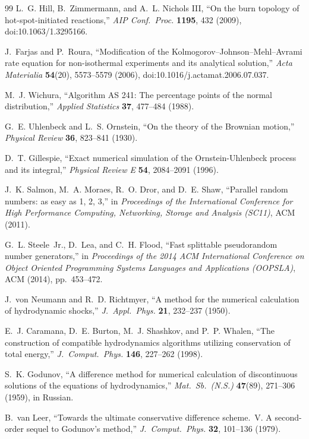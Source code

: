 \begin{thebibliography}{99}
L.~G. Hill, B.~Zimmermann, and A.~L. Nichols III, ``On the burn topology
of hot-spot-initiated reactions,'' \emph{AIP Conf.\ Proc.} \textbf{1195},
432 (2009), doi:10.1063/1.3295166.

J.~Farjas and P.~Roura, ``Modification of the
Kolmogorov--Johnson--Mehl--Avrami rate equation for non-isothermal
experiments and its analytical solution,'' \emph{Acta Materialia}
\textbf{54}(20), 5573--5579 (2006), doi:10.1016/j.actamat.2006.07.037.

M.~J. Wichura, ``Algorithm AS 241: The percentage points of the normal
distribution,'' \emph{Applied Statistics} \textbf{37}, 477--484 (1988).

G.~E. Uhlenbeck and L.~S. Ornstein, ``On the theory of the Brownian
motion,'' \emph{Physical Review} \textbf{36}, 823--841 (1930).

D.~T. Gillespie, ``Exact numerical simulation of the Ornstein-Uhlenbeck
process and its integral,'' \emph{Physical Review E} \textbf{54},
2084--2091 (1996).

J.~K. Salmon, M.~A. Moraes, R.~O. Dror, and D.~E. Shaw, ``Parallel random
numbers: as easy as 1, 2, 3,'' in \emph{Proceedings of the International
Conference for High Performance Computing, Networking, Storage and Analysis
(SC11)}, ACM (2011).

G.~L. Steele~Jr., D.~Lea, and C.~H. Flood, ``Fast splittable pseudorandom
number generators,'' in \emph{Proceedings of the 2014 ACM International
Conference on Object Oriented Programming Systems Languages and
Applications (OOPSLA)}, ACM (2014), pp.~453--472.

J.~von Neumann and R.~D. Richtmyer, ``A method for the numerical
calculation of hydrodynamic shocks,'' \emph{J.\ Appl.\ Phys.}
\textbf{21}, 232--237 (1950).

E.~J. Caramana, D.~E. Burton, M.~J. Shashkov, and P.~P. Whalen, ``The
construction of compatible hydrodynamics algorithms utilizing conservation
of total energy,'' \emph{J.\ Comput.\ Phys.} \textbf{146}, 227--262
(1998).

S.~K. Godunov, ``A difference method for numerical calculation of
discontinuous solutions of the equations of hydrodynamics,''
\emph{Mat.\ Sb.\ (N.S.)} \textbf{47}(89), 271--306 (1959), in Russian.

B.~van Leer, ``Towards the ultimate conservative difference scheme.~V.
A second-order sequel to Godunov's method,'' \emph{J.\ Comput.\ Phys.}
\textbf{32}, 101--136 (1979).

\end{thebibliography}
